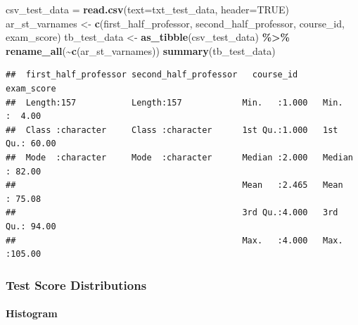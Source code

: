 \documentclass[
]{book}
\newenvironment{Shaded}{\begin{snugshade}}{\end{snugshade}}
\newcommand{\DataTypeTok}[1]{\textcolor[rgb]{0.13,0.29,0.53}{#1}}
\newcommand{\KeywordTok}[1]{\textcolor[rgb]{0.13,0.29,0.53}{\textbf{#1}}}
\newcommand{\NormalTok}[1]{#1}
\newcommand{\OperatorTok}[1]{\textcolor[rgb]{0.81,0.36,0.00}{\textbf{#1}}}
\newcommand{\OtherTok}[1]{\textcolor[rgb]{0.56,0.35,0.01}{#1}}
\newcommand{\StringTok}[1]{\textcolor[rgb]{0.31,0.60,0.02}{#1}}
\begin{document}
\begin{Shaded}
\begin{Highlighting}[]
\NormalTok{csv\_test\_data =}\StringTok{ }\KeywordTok{read.csv}\NormalTok{(}\DataTypeTok{text=}\NormalTok{txt\_test\_data, }\DataTypeTok{header=}\OtherTok{TRUE}\NormalTok{)}
\NormalTok{ar\_st\_varnames \textless{}{-}}\StringTok{ }\KeywordTok{c}\NormalTok{(}\StringTok{\textquotesingle{}first\_half\_professor\textquotesingle{}}\NormalTok{,}
                    \StringTok{\textquotesingle{}second\_half\_professor\textquotesingle{}}\NormalTok{,}
                    \StringTok{\textquotesingle{}course\_id\textquotesingle{}}\NormalTok{, }\StringTok{\textquotesingle{}exam\_score\textquotesingle{}}\NormalTok{)}
\NormalTok{tb\_test\_data \textless{}{-}}\StringTok{ }\KeywordTok{as\_tibble}\NormalTok{(csv\_test\_data) }\OperatorTok{\%\textgreater{}\%}\StringTok{ }
\StringTok{  }\KeywordTok{rename\_all}\NormalTok{(}\OperatorTok{\textasciitilde{}}\KeywordTok{c}\NormalTok{(ar\_st\_varnames))}
\KeywordTok{summary}\NormalTok{(tb\_test\_data)}
\end{Highlighting}
\end{Shaded}

\begin{verbatim}
##  first_half_professor second_half_professor   course_id       exam_score    
##  Length:157           Length:157            Min.   :1.000   Min.   :  4.00  
##  Class :character     Class :character      1st Qu.:1.000   1st Qu.: 60.00  
##  Mode  :character     Mode  :character      Median :2.000   Median : 82.00  
##                                             Mean   :2.465   Mean   : 75.08  
##                                             3rd Qu.:4.000   3rd Qu.: 94.00  
##                                             Max.   :4.000   Max.   :105.00
\end{verbatim}

\hypertarget{test-score-distributions}{%
\subsubsection{Test Score Distributions}\label{test-score-distributions}}

\hypertarget{histogram-1}{%
\paragraph{Histogram}\label{histogram-1}}
\end{document}
